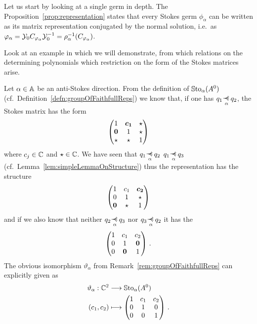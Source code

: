 Let us start by looking at a single germ in depth.
The Proposition~\ref{prop:representation} states that every Stokes germ
$\phi_\alpha$ can be written as its matrix representation conjugated by the
normal solution, i.e.\ as $\varphi_\alpha=\mathcal{Y}_{0}C_{\varphi_\alpha}\mathcal{Y}_{0}^{-1}
=\rho_{\alpha}^{-1}(C_{\varphi_\alpha})$.

Look at an example in which we will demonstrate, from which relations on the
determining polynomials which restriction on the form of the Stokes matrices
arise.
\begin{exmp}
  Let $\alpha\in\mathbb{A}$ be an anti-Stokes direction.
  From the definition of $\operatorname{\mathbb{S}to}_\alpha(A^0)$ (cf.\
  Definition~\ref{defn:groupOfFaithfullReps}) we know that, if one has
  $q_1\myrel{\alpha}q_2$, the Stokes matrix has the form
  \[
    \begin{pmatrix}
      1 & \text{\boldmath$c_1$} & \star
    \\\text{\boldmath$0$} & 1 & \star
    \\\star & \star & 1
    \end{pmatrix}
  \]
  where $c_j\in\mathbb{C}$ and $\star\in\mathbb{C}$.
  We have seen that $q_1\myrel{\alpha}q_2$ \Rightarrow{}
  $q_1\myrel{\alpha}q_3$ (cf.\ Lemma~\ref{lem:simpleLemmaOnStructure}) thus the
  representation has the structure
  \[
    \begin{pmatrix}
      1 & c_1 & \text{\boldmath$c_2$}
    \\0 & 1 & \star
    \\\text{\boldmath$0$} & \star & 1
    \end{pmatrix}
  \]
  and if we also know that neither $q_2\myrel{\alpha}q_3$ nor
  $q_3\myrel{\alpha}q_2$ it has the 
  \[
    \begin{pmatrix}
      1 & c_1 & c_2
    \\0 & 1 & \text{\boldmath$0$}
    \\0 & \text{\boldmath$0$} & 1
    \end{pmatrix}\,.
  \]
  The obvious isomorphism $\vartheta_\alpha$ from
  Remark~\ref{rem:groupOfFaithfullReps} can explicitly given as
  \begin{align*}
    \vartheta_\alpha:\mathbb{C}^2 &\longrightarrow \operatorname{\mathbb{S}to}_\alpha(A^0)
    \\(c_1,c_2)&\longmapsto
                 \begin{pmatrix}
                   1 & c_1 & c_2
                   \\0 & 1 & 0
                   \\0 & 0 & 1
                 \end{pmatrix}
                             \,.
  \end{align*}
\end{exmp}
